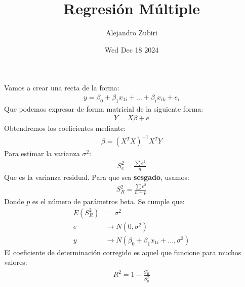 \documentclass{article}
\author{Alejandro Zubiri}
\date{Wed Dec 18 2024}
\title{Regresión Múltiple}
\begin{document}
\maketitle
\tableofcontents
\pagebreak
Vamos a crear una recta de la forma:
\begin{equation}
    \begin{split}
        y = \beta _{0} + \beta _{1} x_{1i}+\dots + \beta _{i} x_{ik} + e_{i}
    \end{split}
\end{equation}
Que podemos expresar de forma matricial de la siguiente forma:
\begin{equation}
    \begin{split}
        Y = X\beta + e
    \end{split}
\end{equation}
Obtendremos los coeficientes mediante:
\begin{equation}
    \begin{split}
        \beta = (X^{T}X)^{-1}X^{T}Y
    \end{split}
\end{equation}
Para estimar la varianza $\sigma^{2}$:
\begin{equation}
    \begin{split}
        S^{2}_{e} = \frac{\sum e^{2}}{n}
    \end{split}
\end{equation}
Que es la varianza residual. Para que sea \textbf{sesgado}, usamos:
\begin{equation}
    \begin{split}
        S^{2}_{R} = \frac{\sum e^{2}}{n-p}
    \end{split}
\end{equation}
Donde $p$ es el número de parámetros beta. Se cumple que:
\begin{equation}
    \begin{split}
        E(S^{2}_{R}) &= \sigma^{2}\\
        e &\to N(0,\sigma^{2})\\
        y &\to N(\beta _{0} + \beta _{1} x_{1i}+\dots, \sigma^{2})
    \end{split}
\end{equation}
El coeficiente de determinación corregido es aquel que funcione para muchos valores:
\begin{equation}
    \begin{split}
        R^{2}=1- \frac{S^{2}_{R}}{S^{2}_{y}}
    \end{split}
\end{equation}
\end{document}
